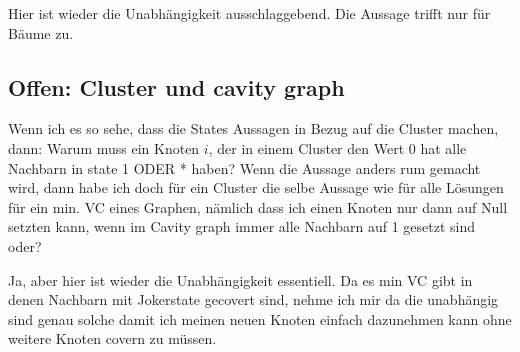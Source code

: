 \documentclass[paper=a4,10pt]{scrartcl}
\begin{document}
Hier ist wieder die Unabhängigkeit ausschlaggebend. Die Aussage trifft nur für Bäume zu.

\subsection{Offen: Cluster und cavity graph}
\label{subsec:cluster_frage}
Wenn ich es so sehe, dass die States Aussagen in Bezug auf die Cluster machen, dann: Warum muss ein Knoten $i$, der in einem Cluster den Wert 0 hat alle Nachbarn in state 1 ODER * haben? Wenn die Aussage anders rum gemacht wird, dann habe ich doch für ein Cluster die selbe Aussage wie für alle Lösungen für ein min. VC eines Graphen, nämlich dass ich einen Knoten nur dann auf Null setzten kann, wenn im Cavity graph immer alle Nachbarn auf 1 gesetzt sind oder?

Ja, aber hier ist wieder die Unabhängigkeit essentiell. Da es min VC gibt in denen Nachbarn mit Jokerstate gecovert sind, nehme ich mir da die unabhängig sind genau solche damit ich meinen neuen Knoten einfach dazunehmen kann ohne weitere Knoten covern zu müssen.
\end{document}
